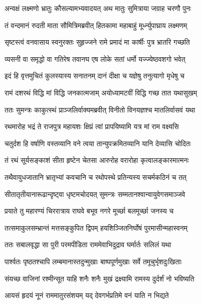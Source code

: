 \twolineshloka
{अन्वक्षं लक्ष्मणो भ्रातुः कौसल्यामभ्यवादयत्}
{अथ मातुः सुमित्राया जग्राह चरणौ पुनः} %

\twolineshloka
{तं वन्दमानं रुदती माता सौमित्रिमब्रवीत्}
{हितकामा महाबाहुं मूर्ध्न्युपाघ्राय लक्ष्मणम्} %

\twolineshloka
{सृष्टस्त्वं वनवासाय स्वनुरक्तः सुहृज्जने}
{रामे प्रमादं मा कार्षीः पुत्र भ्रातरि गच्छति} %

\twolineshloka
{व्यसनी वा समृद्धो वा गतिरेष तवानघ}
{एष लोके सतां धर्मो यज्ज्येष्ठवशगो भवेत्} %

\twolineshloka
{इदं हि वृत्तमुचितं कुलस्यास्य सनातनम्}
{दानं दीक्षा च यज्ञेषु तनुत्यागो मृधेषु च} %

\twolineshloka
{रामं दशरथं विद्धि मां विद्धि जनकात्मजाम्}
{अयोध्यामटवीं विद्धि गच्छ तात यथासुखम्} %

\twolineshloka
{ततः सुमन्त्रः काकुत्स्थं प्राञ्जलिर्वाक्यमब्रवीत्}
{विनीतो विनयज्ञश्च मातलिर्वासवं यथा} %

\twolineshloka
{रथमारोह भद्रं ते राजपुत्र महायशः}
{क्षिप्रं त्वां प्रापयिष्यामि यत्र मां राम वक्ष्यसि} %

\twolineshloka
{चतुर्दश हि वर्षाणि वस्तव्यानि वने त्वया}
{तान्युपक्रमितव्यानि यानि देव्यासि चोदितः} %

\twolineshloka
{तं रथं सूर्यसङ्काशं सीता हृष्टेन चेतसा}
{आरुरोह वरारोहा कृत्वालङ्कारमात्मनः} %

\twolineshloka
{तथैवायुधजातानि भ्रातृभ्यां कवचानि च}
{रथोपस्थे प्रतिन्यस्य सचर्मकठिनं च तत्} %

\twolineshloka
{सीतातृतीयानारूढान्दृष्ट्वा धृष्टमचोदयत्}
{सुमन्त्रः सम्मतानश्वान्वायुवेगसमाञ्जवे} %

\twolineshloka
{प्रयाते तु महारण्यं चिररात्राय राघवे}
{बभूव नगरे मूर्च्छा बलमूर्च्छा जनस्य च} %

\twolineshloka
{तत्समाकुलसम्भ्रान्तं मत्तसङ्कुपित द्विपम्}
{हयशिञ्जितनिर्घोषं पुरमासीन्महास्वनम्} %

\twolineshloka
{ततः सबालवृद्धा सा पुरी परमपीडिता}
{राममेवाभिदुद्राव घर्मार्तः सलिलं यथा} %

\twolineshloka
{पार्श्वतः पृष्ठतश्चापि लम्बमानास्तदुन्मुखाः}
{बाष्पपूर्णमुखाः सर्वे तमूचुर्भृशदुःखिताः} %

\twolineshloka
{संयच्छ वाजिनां रश्मीन्सूत याहि शनैः शनैः}
{मुखं द्रक्ष्यामि रामस्य दुर्दर्शं नो भविष्यति} %

\twolineshloka
{आयसं हृदयं नूनं राममातुरसंशयम्}
{यद् देवगर्भप्रतिमे वनं याति न भिद्यते} %

